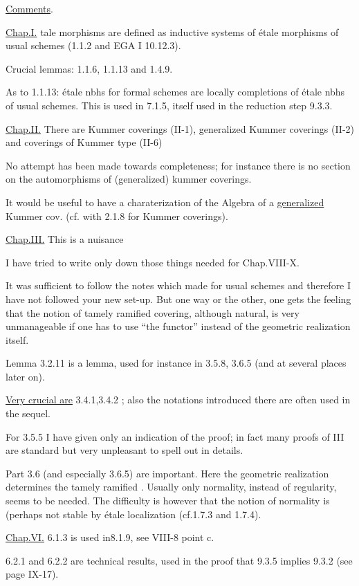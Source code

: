 
\uline{Comments}.

\uline{Chap.I.} tale morphisms are defined as inductive systems of étale morphisms of usual schemes (1.1.2 and EGA I 10.12.3).

Crucial lemmas: 1.1.6, 1.1.13 and 1.4.9.

As to 1.1.13: étale nbhs for formal schemes are locally completions of étale nbhs of usual schemes. This is used in 7.1.5, itself used in the reduction step 9.3.3.

\uline{Chap.II.} There are Kummer coverings (II-1), generalized Kummer coverings (II-2) and coverings of Kummer type (II-6)\handwritten{!}

No attempt has been made towards completeness; for instance there is no section on the automorphisms of (generalized) kummer coverings.

It would be useful to have a charaterization of the Algebra of a \uline{generalized} Kummer cov. (cf. with 2.1.8 for Kummer coverings).

\uline{Chap.III.} This is a nuisance\handwritten{!}

I have tried to write only down those things needed for Chap.VIII-X.

It was sufficient to follow the notes which  made for usual schemes and therefore I have not followed your new set-up. But one way or the other, one gets the feeling that the notion of tamely ramified covering, although natural, is very unmanageable if one has to use ``the functor'' instead of the geometric realization itself.

Lemma 3.2.11 is a  lemma, used for instance in 3.5.8, 3.6.5 (and  at several places later on).

\uline{Very crucial are}  3.4.1,3.4.2 ; also the notations introduced there are often used in the sequel.

For 3.5.5 I have given only an indication of the proof; in fact many proofs of III are standard but very unpleasant to spell out in  details.

Part 3.6 (and especially 3.6.5) are important. Here the geometric realization determines the tamely ramified . Usually only normality, instead of regularity, seems to be needed. The difficulty is however that the notion of normality is (perhaps not stable by étale localization (cf.1.7.3 and 1.7.4).

\uline{Chap.VI.}  6.1.3 is used in8.1.9, see VIII-8 point c.

6.2.1 and 6.2.2 are technical results, used in the proof that 9.3.5 implies 9.3.2 (see  page IX-17).

